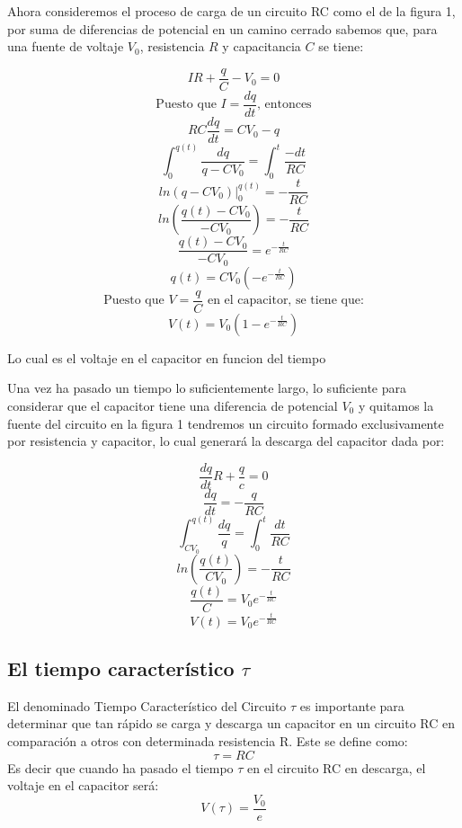 \documentclass[10pt,letter]{article}
\begin{document}
\begin{multicols}{2}
Ahora consideremos el proceso de carga de un circuito RC como el de la figura 1, por suma de diferencias de potencial en un camino cerrado sabemos que, para una fuente de voltaje $V_0$, resistencia $R$ y capacitancia $C$ se tiene: 

$$IR+\dfrac{q}{C}-V_0=0$$
$$\text{Puesto que } I=\dfrac{dq}{dt} \text{, entonces}$$
$$RC\dfrac{dq}{dt}=CV_0-q$$
$$\int_0^{q(t)}\dfrac{dq}{q-CV_0}=\int_0^t\dfrac{-dt}{RC}$$
$$ln(q-CV_0)|_0^{q(t)}=-\dfrac{t}{RC}$$
$$ln\left(\dfrac{q(t)-CV_0}{-CV_0}\right)=-\dfrac{t}{RC}$$
$$\dfrac{q(t)-CV_0}{-CV_0}=e^{-\frac{t}{RC}}$$
$$q(t)=CV_0\left(-e^{-\frac{t}{RC}}\right)$$
$$\text{Puesto que } V=\dfrac{q}{C} \text{ en el capacitor, se tiene que:}$$ 
\begin{equation}
V(t)=V_0\left(1-e^{-\frac{t}{RC}}\right)
\end{equation}

Lo cual es el voltaje en el capacitor en funcion del tiempo

\vspace{0.3cm}

Una vez ha pasado un tiempo lo suficientemente largo, lo suficiente para considerar que el capacitor tiene una diferencia de potencial $V_0$ y quitamos la fuente del circuito en la figura 1 tendremos un circuito formado exclusivamente por resistencia y capacitor, lo cual generará la descarga del capacitor dada por:

$$\dfrac{dq}{dt}R+\dfrac{q}{c}=0$$
$$\dfrac{dq}{dt}=-\dfrac{q}{RC}$$
$$\int_{CV_0}^{q(t)}\dfrac{dq}{q}=\int_0^t\dfrac{dt}{RC}$$
$$ln\left(\dfrac{q(t)}{CV_0}\right)=-\dfrac{t}{RC}$$ 
$$\dfrac{q(t)}{C}=V_0e^{-\frac{t}{RC}}$$
\begin{equation}
V(t)=V_0e^{-\frac{t}{RC}}
\end{equation}

\subsection{El tiempo característico $\tau$ }

El denominado Tiempo Característico del Circuito $\tau$ es importante para determinar que tan rápido se carga y descarga un capacitor en un circuito RC en comparación a otros con determinada resistencia R. Este se define como:
\begin{equation}
\tau=RC
\end{equation}
Es decir que cuando ha pasado el tiempo $\tau$ en el circuito RC en descarga, el voltaje en el capacitor será:
\begin{equation}
V(\tau)=\dfrac{V_0}{e}
\end{equation}


\end{multicols}
\end{document}

